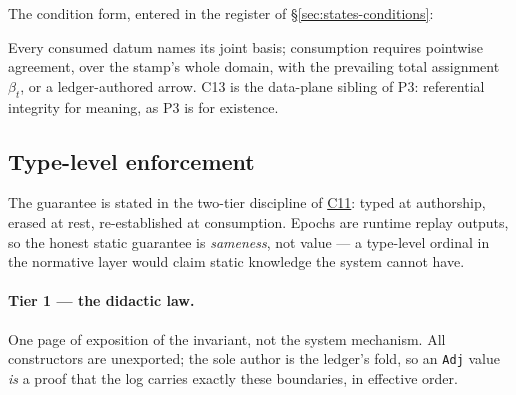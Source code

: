 \documentclass[11pt,a4paper]{article}
\begin{document}
The condition form, entered in the register of \S\ref{sec:states-conditions}:

\begin{description}[style=nextline]
\item[C13 (basis edge).]\hypertarget{cond:C13}{}\label{cond:C13} Every consumed datum
names its joint basis; consumption requires pointwise agreement, over the stamp's whole
domain, with the prevailing total assignment $\beta_t$, or a ledger-authored arrow. C13
is the data-plane sibling of P3: referential integrity for meaning, as P3 is for
existence.
\end{description}

\subsection{Type-level enforcement}
\label{sec:basis-types}

The guarantee is stated in the two-tier discipline of
\hyperref[cond:C11]{C11}: typed at authorship, erased at rest, re-established at
consumption. Epochs are runtime replay outputs, so the honest static guarantee is
\emph{sameness}, not value --- a type-level ordinal in the normative layer would claim
static knowledge the system cannot have.

\paragraph{Tier 1 --- the didactic law.} One page of exposition of the invariant, not
the system mechanism. All constructors are unexported; the sole author is the ledger's
fold, so an \texttt{Adj} value \emph{is} a proof that the log carries exactly these
boundaries, in effective order.
\end{document}
